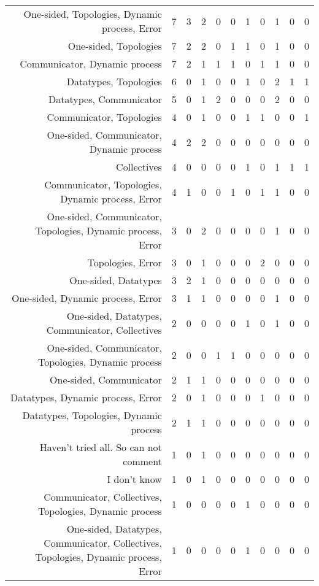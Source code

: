 {\begin{landscape}
\begin{longtable}[htb]{r|c|c|c|c|c|c|c|c|c|c}
{One-sided, Topologies, Dynamic process, Error} & 7 & 3 & 2 & 0 & 0 & 1 & 0 & 1 & 0 & 0 \\%
{One-sided, Topologies} & 7 & 2 & 2 & 0 & 1 & 1 & 0 & 1 & 0 & 0 \\%
{Communicator, Dynamic process} & 7 & 2 & 1 & 1 & 1 & 0 & 1 & 1 & 0 & 0 \\%
{Datatypes, Topologies} & 6 & 0 & 1 & 0 & 0 & 1 & 0 & 2 & 1 & 1 \\%
{Datatypes, Communicator} & 5 & 0 & 1 & 2 & 0 & 0 & 0 & 2 & 0 & 0 \\%
{Communicator, Topologies} & 4 & 0 & 1 & 0 & 0 & 1 & 1 & 0 & 0 & 1 \\%
{One-sided, Communicator, Dynamic process} & 4 & 2 & 2 & 0 & 0 & 0 & 0 & 0 & 0 & 0 \\%
{Collectives} & 4 & 0 & 0 & 0 & 0 & 1 & 0 & 1 & 1 & 1 \\%
{Communicator, Topologies, Dynamic process, Error} & 4 & 1 & 0 & 0 & 1 & 0 & 1 & 1 & 0 & 0 \\%
{One-sided, Communicator, Topologies, Dynamic process, Error} & 3 & 0 & 2 & 0 & 0 & 0 & 0 & 1 & 0 & 0 \\%
{Topologies, Error} & 3 & 0 & 1 & 0 & 0 & 0 & 2 & 0 & 0 & 0 \\%
{One-sided, Datatypes} & 3 & 2 & 1 & 0 & 0 & 0 & 0 & 0 & 0 & 0 \\%
{One-sided, Dynamic process, Error} & 3 & 1 & 1 & 0 & 0 & 0 & 0 & 1 & 0 & 0 \\%
{One-sided, Datatypes, Communicator, Collectives} & 2 & 0 & 0 & 0 & 0 & 1 & 0 & 1 & 0 & 0 \\%
{One-sided, Communicator, Topologies, Dynamic process} & 2 & 0 & 0 & 1 & 1 & 0 & 0 & 0 & 0 & 0 \\%
{One-sided, Communicator} & 2 & 1 & 1 & 0 & 0 & 0 & 0 & 0 & 0 & 0 \\%
{Datatypes, Dynamic process, Error} & 2 & 0 & 1 & 0 & 0 & 0 & 1 & 0 & 0 & 0 \\%
{Datatypes, Topologies, Dynamic process} & 2 & 1 & 1 & 0 & 0 & 0 & 0 & 0 & 0 & 0 \\%
{Haven't tried all. So can not comment} & 1 & 0 & 1 & 0 & 0 & 0 & 0 & 0 & 0 & 0 \\%
{I don't know} & 1 & 0 & 1 & 0 & 0 & 0 & 0 & 0 & 0 & 0 \\%
{Communicator, Collectives, Topologies, Dynamic process} & 1 & 0 & 0 & 0 & 0 & 1 & 0 & 0 & 0 & 0 \\%
{One-sided, Datatypes, Communicator, Collectives, Topologies, Dynamic process, Error} & 1 & 0 & 0 & 0 & 0 & 1 & 0 & 0 & 0 & 0 \\%

\end{longtable}
\end{landscape}}
